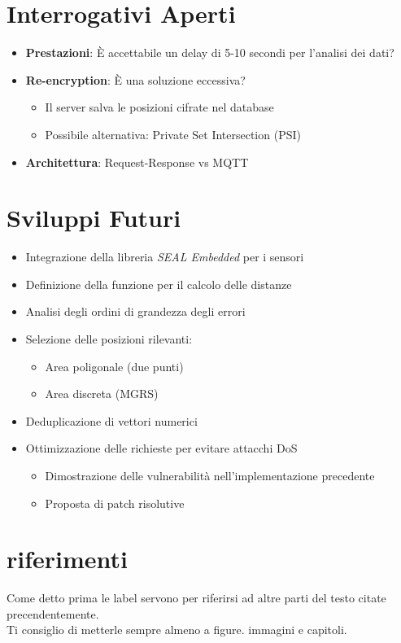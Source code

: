 \documentclass[12pt,a4paper,twoside]{book}
\begin{document}
\section{Interrogativi Aperti}
\begin{itemize}
    \item \textbf{Prestazioni}: È accettabile un delay di 5-10 secondi per l'analisi dei dati?
    \item \textbf{Re-encryption}: È una soluzione eccessiva?
    \begin{itemize}
        \item Il server salva le posizioni cifrate nel database
        \item Possibile alternativa: Private Set Intersection (PSI)
    \end{itemize}
    \item \textbf{Architettura}: Request-Response vs MQTT
\end{itemize}

\section{Sviluppi Futuri}
\begin{itemize}
    \item Integrazione della libreria \emph{SEAL Embedded} per i sensori
    \item Definizione della funzione per il calcolo delle distanze
    \item Analisi degli ordini di grandezza degli errori
    \item Selezione delle posizioni rilevanti:
    \begin{itemize}
        \item Area poligonale (due punti)
        \item Area discreta (MGRS)
    \end{itemize}
    \item Deduplicazione di vettori numerici
    \item Ottimizzazione delle richieste per evitare attacchi DoS
    \begin{itemize}
        \item Dimostrazione delle vulnerabilità nell'implementazione precedente
        \item Proposta di patch risolutive
    \end{itemize}
\end{itemize}


\section{riferimenti}
Come detto prima le label servono per riferirsi ad altre parti del testo citate precendentemente.\\
Ti consiglio di metterle sempre almeno a figure. immagini e capitoli.
\end{document}
